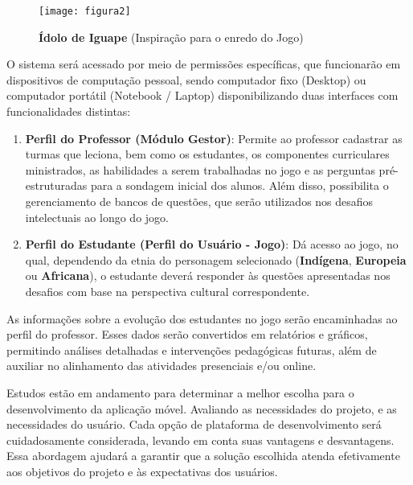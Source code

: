     \begin{figure}[!h]
        \centering
        \caption{ \textbf{Ídolo de Iguape} (Inspiração para o enredo do Jogo) }%
        \label{fig:figura2}
        \texttt{[image: figura2]}
    \end{figure}
    
    O sistema será acessado por meio de permissões específicas, que funcionarão em dispositivos de computação pessoal, sendo computador fixo (Desktop) ou computador portátil (Notebook / Laptop) disponibilizando duas interfaces com funcionalidades distintas:
    
    \begin{enumerate}
        \item \textbf{Perfil do Professor (Módulo Gestor)}: Permite ao professor cadastrar as turmas que leciona, bem como os estudantes, os componentes curriculares ministrados, as habilidades a serem trabalhadas no jogo e as perguntas pré-estruturadas para a sondagem inicial dos alunos. Além disso, possibilita o gerenciamento de bancos de questões, que serão utilizados nos desafios intelectuais ao longo do jogo.
    
        \item \textbf{Perfil do Estudante (Perfil do Usuário - Jogo)}: Dá acesso ao jogo, no qual, dependendo da etnia do personagem selecionado (\textbf{Indígena}, \textbf{Europeia} ou \textbf{Africana}), o estudante deverá responder às questões apresentadas nos desafios com base na perspectiva cultural correspondente.
    \end{enumerate}
    
    As informações sobre a evolução dos estudantes no jogo serão encaminhadas ao perfil do professor. Esses dados serão convertidos em relatórios e gráficos, permitindo análises detalhadas e intervenções pedagógicas futuras, além de auxiliar no alinhamento das atividades presenciais e/ou online.
    
    Estudos estão em andamento para determinar a melhor escolha para o desenvolvimento da aplicação móvel. Avaliando as necessidades do projeto, e as necessidades do usuário. Cada opção de plataforma de desenvolvimento será cuidadosamente considerada, levando em conta suas vantagens e desvantagens. Essa abordagem ajudará a garantir que a solução escolhida atenda efetivamente aos objetivos do projeto e às expectativas dos usuários.
    